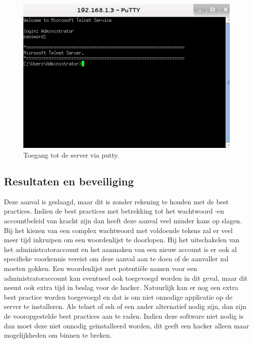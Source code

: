 \documentclass[pdftex,a4paper,12pt]{report}
\begin{document}
\begin{figure}[H]
\begin{center}
\includegraphics[scale=0.80]{img/HydraPutty}
\end{center}
\caption{Toegang tot de server via putty.}
\label{img:Putty}
\end{figure}

\subsection{Resultaten en beveiliging}
Deze aanval is geslaagd, maar dit is zonder rekening te houden met de best practices. Indien de best practices met betrekking tot het wachtwoord -en accountbeleid van kracht zijn dan heeft deze aanval veel minder kans op slagen. Bij het kiezen van een complex wachtwoord met voldoende tekens zal er veel meer tijd inkruipen om een woordenlijst te doorlopen. Hij het uitschakelen van het administratoraccount en het aanmaken van een nieuw account is er ook al specifieke voorkennis vereist om deze aanval aan te doen of de aanvaller zal moeten gokken. Een woordenlijst met potentiële namen voor een administratoraccount kan eventueel ook toegevoegd worden in dit geval, maar dit neemt ook extra tijd in beslag voor de hacker. Natuurlijk kan er nog een extra best practice worden toegevoegd en dat is om niet onnodige applicatie op de server te installeren. Als telnet of ssh of een ander alternatief nodig zijn, dan zijn de vooropgestelde best practices aan te raden. Indien deze software niet nodig is dan moet deze niet onnodig geïnstalleerd worden, dit geeft een hacker alleen maar mogelijkheden om binnen te breken.
\end{document}
